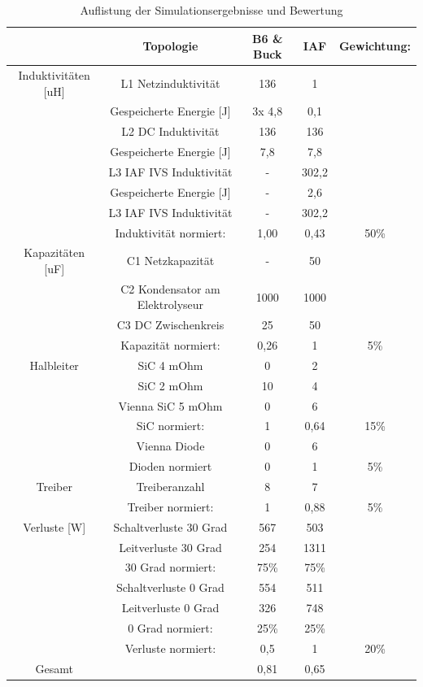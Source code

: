 \begin{table}
\begin{tabular}{|c|c|c|c|c|}
	\hline
	& Topologie & B6 \& Buck & \gls{IAF} & Gewichtung: \\
	\hline
	Induktivitäten [uH] & L1 Netzinduktivität & 136 & 1 &  \\
	\hline
	 & Gespeicherte Energie [J] & 3x 4,8 & 0,1 & \\
	\hline
	& L2 DC Induktivität & 136 & 136 &  \\
	\hline
	& Gespeicherte Energie [J] & 7,8 & 7,8 &  \\
	\hline
	& L3 IAF IVS Induktivität & - & 302,2 &  \\
	\hline
	& Gespeicherte Energie [J] & - & 2,6 & \\
	\hline
	& L3 IAF IVS Induktivität & - & 302,2 &  \\
	\hline
	& Induktivität normiert: & 1,00 & 0,43 & 50\% \\
	\hline
	Kapazitäten [uF] & C1 Netzkapazität & - & 50 &  \\
	\hline
	& C2 Kondensator am Elektrolyseur & 1000 & 1000 &  \\
	\hline
	& C3 DC Zwischenkreis & 25 & 50 &  \\
	\hline
	& Kapazität normiert: & 0,26 & 1 & 5\% \\
	\hline
	Halbleiter & SiC 4 mOhm & 0 & 2 &  \\
	\hline
	& SiC 2 mOhm & 10 & 4 &  \\
	\hline
	& Vienna SiC 5 mOhm & 0 & 6 &  \\
	\hline
	& SiC normiert: & 1 & 0,64 & 15\% \\
	\hline
	& Vienna Diode & 0 & 6 &  \\
	\hline
	& Dioden normiert & 0 & 1 & 5\% \\
	\hline
	Treiber & Treiberanzahl & 8 & 7 &  \\
	\hline
	& Treiber normiert: & 1 & 0,88 & 5\% \\
	\hline
	Verluste [W] & Schaltverluste 30 Grad & 567 & 503 &  \\
	\hline
	& Leitverluste 30 Grad & 254 & 1311 &  \\
	\hline
	& 30 Grad normiert: & 75\% & 75\% &  \\
	\hline
	& Schaltverluste 0 Grad & 554 & 511 &  \\
	\hline
	& Leitverluste 0 Grad & 326 & 748 &  \\
	\hline
	& 0 Grad normiert: & 25\% & 25\% &  \\
	\hline
	& Verluste normiert: & 0,5 & 1 & 20\% \\
	\hline
	Gesamt &  &  0,81 & 0,65 & \\
	\hline
\end{tabular}
\caption{Auflistung der Simulationsergebnisse und Bewertung}
\label{tab:Auswertung}
\end{table}

